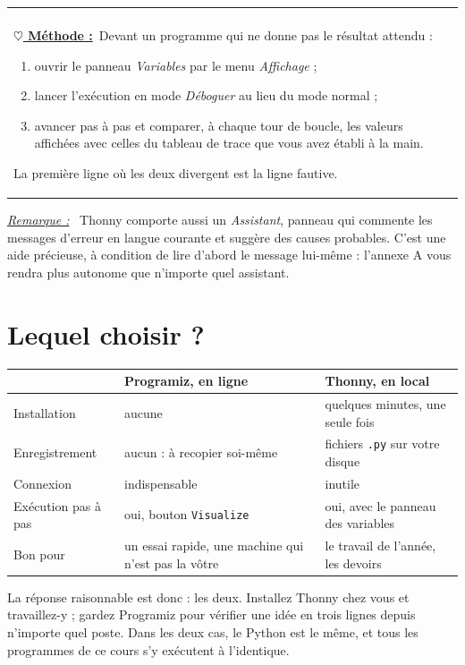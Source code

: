 \documentclass[a4paper,11pt,openany]{book}
\makeatletter
\newcommand{\code}[1]{\texttt{\textcolor{codebleu}{#1}}}
\newenvironment{cadre}%
 {\par\vspace{2mm}\noindent\begin{tabular}{|@{\hspace{4mm}}p{0.93\textwidth}@{\hspace{4mm}}|}
  \hline \\[-2mm]}%
 {\\[2mm] \hline \end{tabular}\par\vspace{3mm}}
\newcommand{\methode}{\textbf{\underline{$\heartsuit$ Méthode :}}~}
\newenvironment{remarque}%
 {\par\vspace{1mm}\begin{list}{}{\leftmargin=1cm \rightmargin=0.5cm}\item[]%
  \textit{\underline{Remarque :}}~}%
 {\end{list}\vspace{1mm}}
\renewcommand{\arraystretch}{1.4}
\makeatother
\begin{document}
\begin{cadre}
\methode Devant un programme qui ne donne pas le résultat attendu :
\begin{enumerate}[leftmargin=8mm,itemsep=0.5mm,topsep=1mm]
\item ouvrir le panneau \emph{Variables} par le menu \emph{Affichage} ;
\item lancer l'exécution en mode \emph{Déboguer} au lieu du mode normal ;
\item avancer pas à pas et comparer, à chaque tour de boucle, les valeurs affichées avec celles du tableau de trace que vous avez établi à la main.
\end{enumerate}
La première ligne où les deux divergent est la ligne fautive.
\end{cadre}

\begin{remarque}
Thonny comporte aussi un \emph{Assistant}, panneau qui commente les messages d'erreur en langue courante et suggère des causes probables. C'est une aide précieuse, à condition de lire d'abord le message lui-même : l'annexe A vous rendra plus autonome que n'importe quel assistant.
\end{remarque}

\section{Lequel choisir ?}

\begin{center}
\renewcommand{\arraystretch}{1.5}
\begin{tabular}{|p{3.1cm}|p{5.3cm}|p{5.3cm}|}
\hline
\rowcolor{orange!50} & \textbf{Programiz, en ligne} & \textbf{Thonny, en local} \\
\hline
Installation & aucune & quelques minutes, une seule fois \\
\hline
Enregistrement & aucun : à recopier soi-même & fichiers \code{.py} sur votre disque \\
\hline
Connexion & indispensable & inutile \\
\hline
Exécution pas à pas & oui, bouton \code{Visualize} & oui, avec le panneau des variables \\
\hline
Bon pour & un essai rapide, une machine qui n'est pas la vôtre & le travail de l'année, les devoirs \\
\hline
\end{tabular}
\end{center}

La réponse raisonnable est donc : les deux. Installez Thonny chez vous et travaillez-y ; gardez Programiz pour vérifier une idée en trois lignes depuis n'importe quel poste. Dans les deux cas, le Python est le même, et tous les programmes de ce cours s'y exécutent à l'identique.
\end{document}
